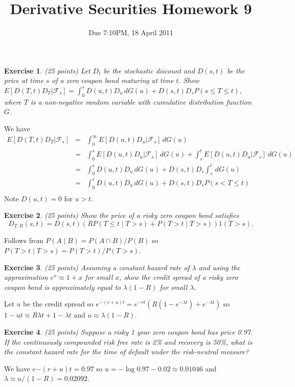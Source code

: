 \documentclass[11pt,fleqn]{amsproc}
\newcommand{\F}{\mathcal{F}}
\newtheorem{xca}{Exercise}
\begin{document}
\title{Derivative Securities Homework 9}
\author{Due 7:10PM, 18 April 2011}

\maketitle


\begin{xca}{(25 points)}
Let $D_t$ be the stochastic discount and $D(s,t)$ be the price at time
$s$ of a zero coupon bond maturing at time $t$.  Show $E[D(T,t)D_T|\F_s]
= \int_0^s D(u,t)D_u\,dG(u) + D(s,t) D_s P(s\le T\le t)$, where $T$ is a
non-negative random variable with cumulative distribution function $G$.

\end{xca}

We have 
\begin{eqnarray*}
E[D(T,t)D_T|\F_s] &=& \int_0^\infty E[D(u,t)D_u|\F_s]\,dG(u)\\
&=& \int_0^s E[D(u,t)D_u|\F_s]\,dG(u) + \int_s^t E[D(u,t)D_u|\F_s]\,dG(u)\\
&=& \int_0^s D(u,t)D_u\,dG(u) + D(s,t)D_s\int_s^t \,dG(u)\\
&=& \int_0^s D(u,t)D_u\,dG(u) + D(s,t)D_s P(s < T \le t)\\
\end{eqnarray*}
Note $D(u, t) = 0$ for $u > t$.

\begin{xca}{(25 points)}
Show the price of a risky zero coupon bond satisfies
$$D_{T,R}(s, t) = D(s,t)(RP(T\le t\mid T > s)
+ P(T > t\mid T > s))1(T > s).$$
\end{xca}

Follows from $P(A\mid B) = P(A\cap B)/P(B)$
so $P(T>t\mid T>s) = P(T > t)/P(T > s)$.

\begin{xca}{(25 points)}
Assuming a constant hazard rate of $\lambda$ and using the approximation
$e^x \approx 1 + x$ for small $x$, show the credit spread of a risky
zero coupon bond is approximately equal to $\lambda(1 - R)$ for small
$\lambda$.

\end{xca}

Let $u$ be the credit spread so $e^{-(r + u)t} = e^{-rt}(R(1 - e^{-\lambda t})
+ e^{-\lambda t})$ so $1 - ut \approx R\lambda t + 1 - \lambda t$ and
$u\approx \lambda(1 - R)$.

\begin{xca}{(25 points)}
Suppose a risky 1 year zero coupon bond has price 0.97. If the continuously
compounded risk free rate is 2\% and recovery is 50\%, what is the
constant hazard rate for the time of default under the risk-neutral 
measure?

\end{xca}
We have $e{-(r + u)t} = 0.97$ so $u = -\log 0.97 - 0.02 \approx 0.01046$
and $\lambda \approx u/(1 - R) = 0.02092$.
\end{document}
